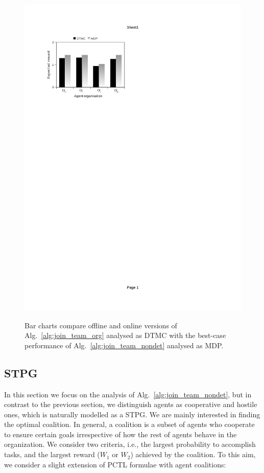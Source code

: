 \documentclass{llncs}
\begin{document}
\begin{figure}[H]
{\includegraphics[clip=true, trim=63 581.5 320 80, scale=0.77]{images/w2_mdp_online}
}
\caption{Bar charts compare offline and online versions of Alg.~\ref{alg:join_team_org} analysed as DTMC with the best-case performance of Alg.~\ref{alg:join_team_nondet} analysed as MDP. }
\label{fig:bar_chart_mdp}
\end{figure}



\subsection{STPG}
\label{subsec:STPG}
In this section we focus on the analysis of Alg.~\ref{alg:join_team_nondet}, but in contrast to the previous section,
we distinguish agents as cooperative and hostile ones, which is naturally modelled as a STPG. We are mainly interested in finding the optimal coalition. In general,
a coalition is a subset of agents who cooperate to ensure certain goals irrespective of how the rest of agents behave in the organization. We consider two criteria,
i.e., the largest probability to accomplish tasks, and the largest reward ($W_1$ or $W_2$) achieved by the coalition. To this aim, we consider a slight extension of
PCTL formulae with agent coalitions:
\end{document}
